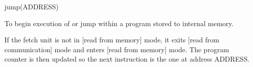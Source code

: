 

\format
jump(ADDRESS)

\purpose

To begin execution of or jump within a program stored to internal memory.

\description

If the fetch unit is not in [read from memory] mode, it exits [read from communication] mode and enters [read from memory] mode.
The program counter is then updated so the next instruction is the one at address ADDRESS.
